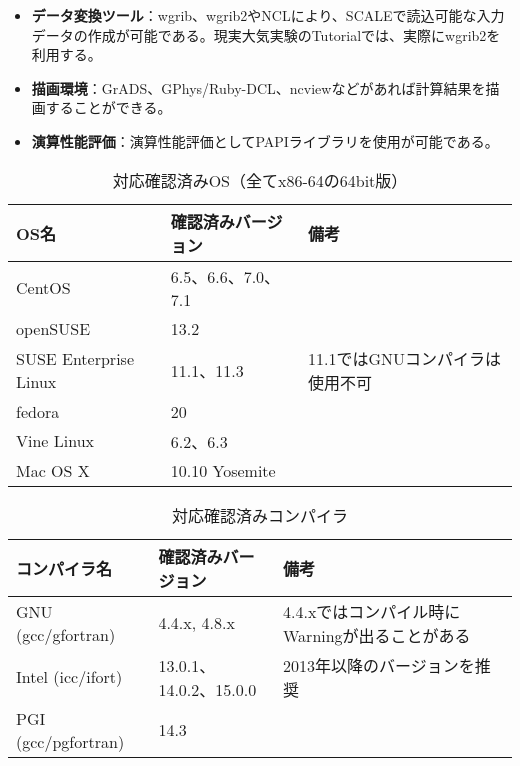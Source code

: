 \begin{itemize}
  \item {\bf データ変換ツール}：wgrib、wgrib2やNCLにより、SCALEで読込可能な入力データの作成が可能である。現実大気実験のTutorialでは、実際にwgrib2を利用する。
  \item {\bf 描画環境}：GrADS、GPhys/Ruby-DCL、ncviewなどがあれば計算結果を描画することができる。
  \item {\bf 演算性能評価}：演算性能評価としてPAPIライブラリを使用が可能である。
\end{itemize}


\begin{table}[htb]
\begin{center}
\caption{対応確認済みOS（全てx86-64の64bit版）}
\begin{tabularx}{150mm}{|l|l|X|} \hline
 \rowcolor[gray]{0.9} OS名 & 確認済みバージョン & 備考 \\ \hline
 CentOS                & 6.5、6.6、7.0、7.1 &  \\ \hline
 openSUSE              & 13.2               &  \\ \hline
 SUSE Enterprise Linux & 11.1、11.3         & 11.1ではGNUコンパイラは使用不可 \\ \hline
 fedora                & 20                 &  \\ \hline
 Vine Linux            & 6.2、6.3           &  \\ \hline
 Mac OS X              & 10.10 Yosemite     &  \\ \hline
\end{tabularx}
\label{tab:compatible_os}
\end{center}
\end{table}

\begin{table}[htb]
\begin{center}
\caption{対応確認済みコンパイラ}
\begin{tabularx}{150mm}{|l|l|X|} \hline
 \rowcolor[gray]{0.9} コンパイラ名 & 確認済みバージョン & 備考 \\ \hline
 GNU (gcc/gfortran)    & 4.4.x, 4.8.x           & 4.4.xではコンパイル時にWarningが出ることがある \\ \hline
 Intel (icc/ifort)     & 13.0.1、14.0.2、15.0.0 & 2013年以降のバージョンを推奨 \\ \hline
 PGI (gcc/pgfortran)   & 14.3                   &  \\ \hline
\end{tabularx}
\label{tab:compatible_compiler}
\end{center}
\end{table}

